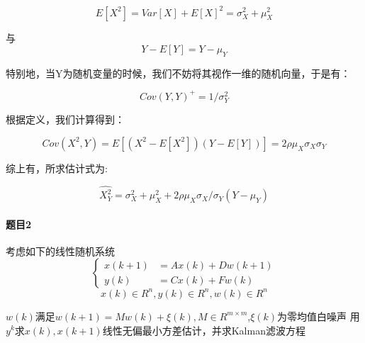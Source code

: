 \documentclass[12pt, a4paper]{ctexart}
\begin{document}
\[
    E[X^2] = Var[X] + E[X]^2 = \sigma_X^2+ \mu_X^2
\]

与
\[
    Y-E[Y]=Y-\mu_Y
\]

特别地，当Y为随机变量的时候，我们不妨将其视作一维的随机向量，于是有：

\[
    Cov(Y,Y)^+ = 1/\sigma_Y^2
\]

根据定义，我们计算得到：

\[
    Cov(X^2,Y)=E[(X^2-E[X^2])(Y-E[Y])]=2\rho\mu_X\sigma_X\sigma_Y
\]

综上有，所求估计式为:

\[
    \hat{X^2_Y} = \sigma_X^2 +\mu_X^2 +2\rho\mu_X\sigma_X/\sigma_Y(Y-\mu_Y)
\]

\paragraph{题目2}
考虑如下的线性随机系统
	\[
	\left\{\begin{array}{rl}
		x(k+1)&=Ax(k)+Dw(k+1)\\
		y(k)&=Cx(k)+Fw(k)
		\end{array}\right.
	\]
	\[
		x(k)\in R^n,y(k)\in R^n,w(k)\in R^n
	\]

	$w(k)$满足$w(k+1)=Mw(k)+\xi(k),M\in R^{m\times m}$,$\xi(k)$为零均值白噪声
    用$y^k$求$x(k),x(k+1)$线性无偏最小方差估计，并求Kalman滤波方程
    
\end{document}

